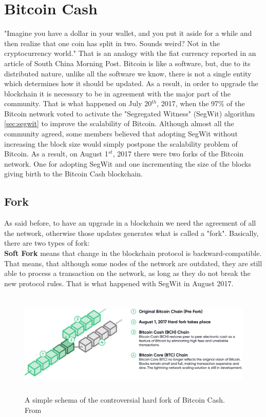 \chapter{Bitcoin Cash}
\label{cha:bch}

"Imagine you have a dollar in your wallet, and you put it aside for a while and 
then realize that one coin has split in two. Sounds weird? Not in the cryptocurrency 
world." That is an analogy with the fiat currency reported in an article of 
South China Morning Post\cite{scmp}.
Bitcoin is like a software, but, due to its distributed nature, unlike all the 
software we know, there is not a single entity which determines how it should be 
updated. As a result, in order to upgrade the blockchain it is necessary to be in 
agreement with the major part of the community. That is what happened on July 20$^{th}$,
2017, when the 97\% of the Bitcoin network voted to activate the "Segregated 
Witness" (SegWit) algorithm \ref{sec:segwit} to improve the scalability of Bitcoin. Although almost 
all the community agreed, some members believed that adopting SegWit without 
increasing the block size would simply postpone the scalability problem of Bitcoin.
As a result, on August 1$^{st}$, 2017 there were two forks of the Bitcoin network. 
One for adopting SegWit and one incrementing the size of the blocks giving 
birth to the Bitcoin Cash blockchain.\cite{scmp}\cite{thecryptonomist}

\section{Fork}
\label{sec:fork}

As said before, to have an upgrade in a blockchain we need the agreement of all
the network, otherwise those updates generates what is called a "fork". Basically, there are two types 
of fork:\medskip\\

\textbf{Soft Fork}
means that change in the blockchain protocol is backward-compatible. That means,
that although some nodes of the network are outdated, they are still able to 
process a transaction on the network, as long as they do not break the new protocol rules.
That is what happened with SegWit in August 2017.\medskip 
\begin{figure}
    \centering
    \includegraphics[height=5cm]{fork-img.png}
    \caption{A simple schema of the controversial hard fork of Bitcoin Cash. From \cite{bitcoin.com}}
    \label{fig:hardfork}
\end{figure}\\

